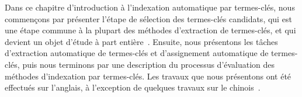     Dans ce chapitre d'introduction à l'indexation automatique par termes-clés,
    nous commençons par présenter l'étape de sélection des termes-clés
    candidats, qui est une étape commune à la plupart des méthodes d'extraction
    de termes-clés, et qui devient un objet d'étude à part
    entière~\cite{wang2014keyphraseextractionpreprocessing}. Ensuite, nous
    présentons les tâches d'extraction automatique de termes-clés et
    d'assignement automatique de termes-clés, puis nous terminons par une
    description du processus d'évaluation des méthodes d'indexation par
    termes-clés. Les travaux que nous présentons ont été effectués sur
    l'anglais, à l'exception de quelques travaux sur le
    chinois~\cite{ding2011binaryintegerprogramming,zhang2008crfkeywordextraction}.


